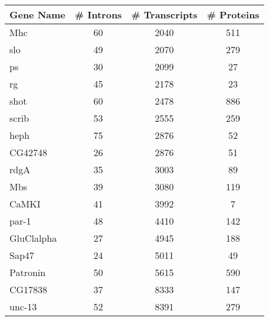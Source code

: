 \renewcommand{\arraystretch}{0.6}
\small
\centering
\begin{tabular}[c]{lccc}
	\textbf{Gene Name} & \textbf{\# Introns} & \textbf{\# Transcripts} & \textbf{\# Proteins}\\ \hline 
	Mhc                & 60                  & 2040                    & 511\\                         
	slo                & 49                  & 2070                    & 279\\                         
	ps                 & 30                  & 2099                    & 27\\                          
	rg                 & 45                  & 2178                    & 23\\                          
	shot               & 60                  & 2478                    & 886\\                         
	scrib              & 53                  & 2555                    & 259\\                         
	heph               & 75                  & 2876                    & 52\\                          
	CG42748            & 26                  & 2876                    & 51\\                          
	rdgA               & 35                  & 3003                    & 89\\                          
	Mbs                & 39                  & 3080                    & 119\\                         
	CaMKI              & 41                  & 3992                    & 7\\                           
	par-1              & 48                  & 4410                    & 142\\                         
	GluClalpha         & 27                  & 4945                    & 188\\                         
	Sap47              & 24                  & 5011                    & 49\\                          
	Patronin           & 50                  & 5615                    & 590\\                         
	CG17838            & 37                  & 8333                    & 147\\                         
	unc-13             & 52                  & 8391                    & 279\\                         

\end{tabular}
